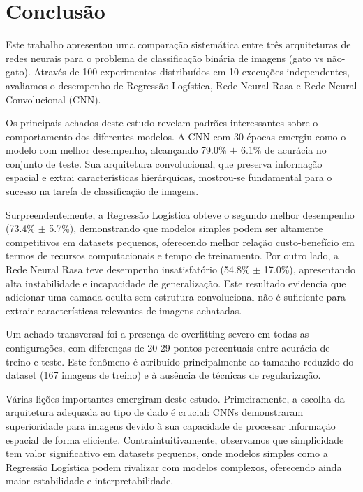 \documentclass[a4paper,12pt]{article}
\begin{document}
\section{Conclusão}
\label{sec:conclusao}

Este trabalho apresentou uma comparação sistemática entre três arquiteturas de redes neurais para o problema de classificação binária de imagens (gato vs não-gato). Através de 100 experimentos distribuídos em 10 execuções independentes, avaliamos o desempenho de Regressão Logística, Rede Neural Rasa e Rede Neural Convolucional (CNN).

Os principais achados deste estudo revelam padrões interessantes sobre o comportamento dos diferentes modelos. A CNN com 30 épocas emergiu como o modelo com melhor desempenho, alcançando 79.0\% $\pm$ 6.1\% de acurácia no conjunto de teste. Sua arquitetura convolucional, que preserva informação espacial e extrai características hierárquicas, mostrou-se fundamental para o sucesso na tarefa de classificação de imagens.

Surpreendentemente, a Regressão Logística obteve o segundo melhor desempenho (73.4\% $\pm$ 5.7\%), demonstrando que modelos simples podem ser altamente competitivos em datasets pequenos, oferecendo melhor relação custo-benefício em termos de recursos computacionais e tempo de treinamento. Por outro lado, a Rede Neural Rasa teve desempenho insatisfatório (54.8\% $\pm$ 17.0\%), apresentando alta instabilidade e incapacidade de generalização. Este resultado evidencia que adicionar uma camada oculta sem estrutura convolucional não é suficiente para extrair características relevantes de imagens achatadas.

Um achado transversal foi a presença de overfitting severo em todas as configurações, com diferenças de 20-29 pontos percentuais entre acurácia de treino e teste. Este fenômeno é atribuído principalmente ao tamanho reduzido do dataset (167 imagens de treino) e à ausência de técnicas de regularização.

Várias lições importantes emergiram deste estudo. Primeiramente, a escolha da arquitetura adequada ao tipo de dado é crucial: CNNs demonstraram superioridade para imagens devido à sua capacidade de processar informação espacial de forma eficiente. Contraintuitivamente, observamos que simplicidade tem valor significativo em datasets pequenos, onde modelos simples como a Regressão Logística podem rivalizar com modelos complexos, oferecendo ainda maior estabilidade e interpretabilidade.
\end{document}
